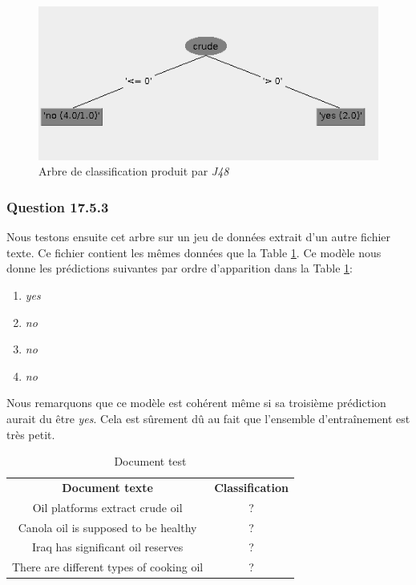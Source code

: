 \documentclass[10pt,a4paper]{article}
\begin{document}
			\begin{figure}[h]
				\centering
				\includegraphics[width=.5\textwidth]{text_tree}
				\caption{Arbre de classification produit par \textit{J48}}
				\label{fig:text:training:tree}
			\end{figure}
			 
			\subsubsection*{Question 17.5.3}
			
			Nous testons ensuite cet arbre sur un jeu de données extrait d'un autre fichier texte. Ce fichier contient les mêmes données que la Table \ref{tab:oil:test}. Ce modèle nous donne les prédictions suivantes par ordre d'apparition dans la Table \ref{tab:oil:test}:
			
			\begin{enumerate}
				\item \textit{yes}      
				\item \textit{no}
				\item \textit{no}
				\item \textit{no}  
			\end{enumerate}
			
			Nous remarquons que ce modèle est cohérent même si sa troisième prédiction aurait du être \textit{yes}. Cela est sûrement dû au fait que l'ensemble d'entraînement est très petit.
			
			\begin{table}[h]
				\centering
				\caption{Document test}
				\label{tab:oil:test}
				\begin{tabular}{|c c|}
					\hline
					\textbf{Document texte} & \textbf{Classification}\\
					Oil platforms extract crude oil & ?\\
					Canola oil is supposed to be healthy & ?\\
					Iraq has significant oil reserves & ?\\
					There are different types of cooking oil & ?\\
					\hline
				\end{tabular}
			\end{table}
			
\end{document}
